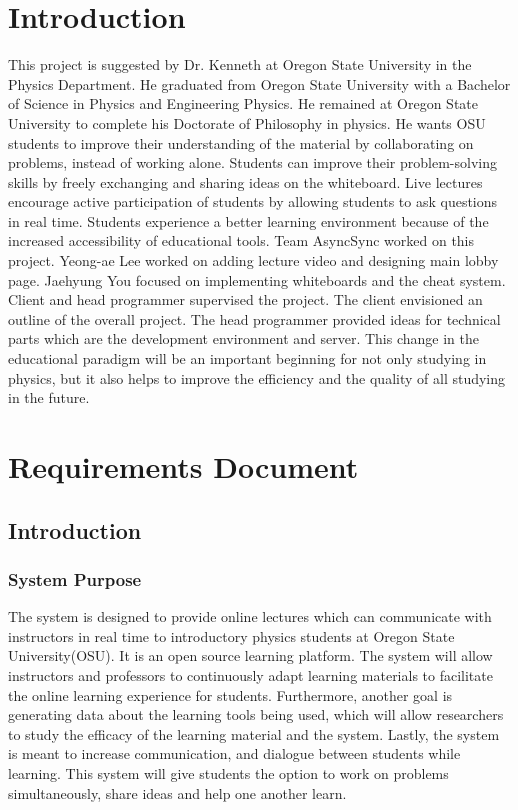 \documentclass[10pt]{article}
\begin{document}
\section{Introduction}
    This project is suggested by Dr. Kenneth at Oregon State University in the Physics Department. He graduated from Oregon State University with a Bachelor of Science in Physics and Engineering Physics. He remained at Oregon State University to complete his Doctorate of Philosophy in physics. He wants OSU students to improve their understanding of the material by collaborating on problems, instead of working alone. Students can improve their problem-solving skills by freely exchanging and sharing ideas on the whiteboard. Live lectures encourage active participation of students by allowing students to ask questions in real time. Students experience a better learning environment because of the increased accessibility of educational tools. Team AsyncSync worked on this project. Yeong-ae Lee worked on adding lecture video and designing main lobby page. Jaehyung You focused on implementing whiteboards and the cheat system. Client and head programmer supervised the project. The client envisioned an outline of the overall project. The head programmer provided ideas for technical parts which are the development environment and server. This change in the educational paradigm will be an important beginning for not only studying in physics, but it also helps to improve the efficiency and the quality of all studying in the future.

\section{Requirements Document}
    \subsection{Introduction}
        \subsubsection{System Purpose}
            The system is designed to provide online lectures which can communicate with instructors in real time to introductory physics students at Oregon State University(OSU). It is an open source learning platform. The system will allow instructors and professors to continuously adapt learning materials to facilitate the online learning experience for students. Furthermore, another goal is generating data about the learning tools being used, which will allow researchers to study the efficacy of the learning material and the system. Lastly, the system is meant to increase communication, and dialogue between students while learning. This system will give students the option to work on problems simultaneously, share ideas and help one another learn.
\end{document}
